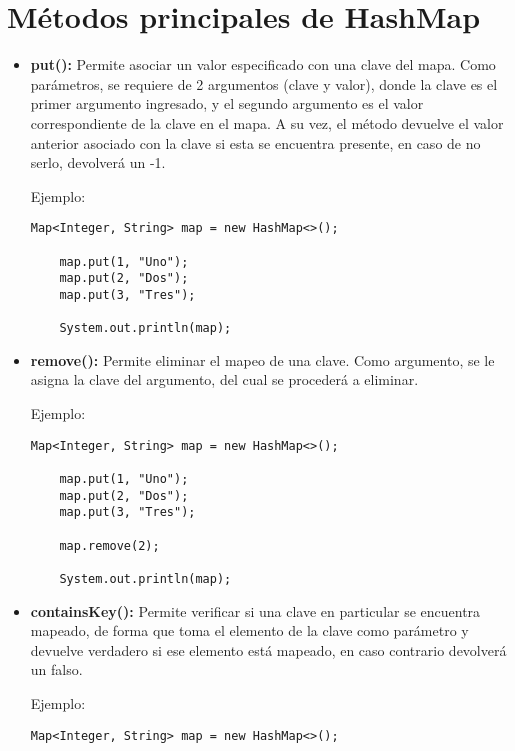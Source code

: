 \documentclass[12pt, letterpaper]{article} %
\begin{document}
\section*{Métodos principales de HashMap}

\begin{itemize}
    \item \textbf{put():} Permite asociar un valor especificado con una clave del mapa. Como parámetros, se requiere de 2 argumentos (clave y valor), donde la clave es el primer argumento ingresado, y el segundo argumento es el valor correspondiente de la clave en el mapa. A su vez, el método devuelve el valor anterior asociado con la clave si esta se encuentra presente, en caso de no serlo, devolverá un -1.
    
    Ejemplo:
    \lstset{language = Java, breaklines=true, basicstyle=\footnotesize}
    \begin{lstlisting}[frame=single]
    Map<Integer, String> map = new HashMap<>();

    map.put(1, "Uno");
    map.put(2, "Dos");
    map.put(3, "Tres");

    System.out.println(map);
    \end{lstlisting}

    \item \textbf{remove():} Permite eliminar el mapeo de una clave. Como argumento, se le asigna la clave del argumento, del cual se procederá a eliminar. 
    
    Ejemplo:
    \lstset{language = Java, breaklines=true, basicstyle=\footnotesize}
    \begin{lstlisting}[frame=single]
    Map<Integer, String> map = new HashMap<>();

    map.put(1, "Uno");
    map.put(2, "Dos");
    map.put(3, "Tres");

    map.remove(2);

    System.out.println(map);
    \end{lstlisting}

    \item \textbf{containsKey():} Permite verificar si una clave en particular se encuentra mapeado, de forma que toma el elemento de la clave como parámetro y devuelve verdadero si ese elemento está mapeado, en caso contrario devolverá un falso.
    
    Ejemplo:
    \lstset{language = Java, breaklines=true, basicstyle=\footnotesize}
    \begin{lstlisting}[frame=single]
    Map<Integer, String> map = new HashMap<>();


\end{lstlisting}
\end{itemize}
\end{document}

